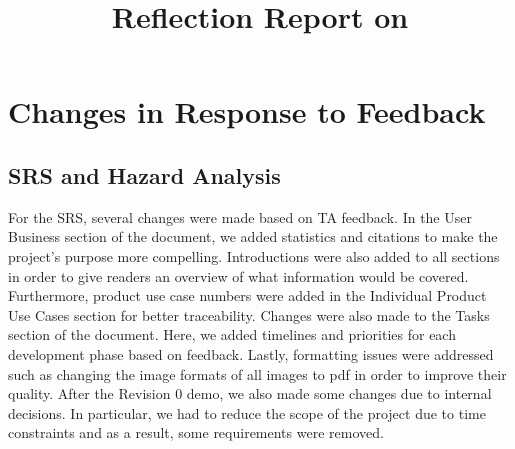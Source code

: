 \documentclass{article}
\title{Reflection Report on \progname}
\author{\authname}
\date{}
\begin{document}
\maketitle


\section{Changes in Response to Feedback}




\subsection{SRS and Hazard Analysis}

For the SRS, several changes were made based on TA feedback. In the User Business
section of the document, we added statistics and citations to make the project's purpose
more compelling. Introductions were also added to all sections in order to give readers an
overview of what information would be covered. Furthermore, product use case numbers were added
in the Individual Product Use Cases section for better traceability. Changes were also made
to the Tasks section of the document. Here, we added timelines and priorities for each development
phase based on feedback. Lastly, formatting issues were addressed such as changing the image formats
of all images to pdf in order to improve their quality. After the Revision 0 demo, we also made
some changes due to internal decisions. In particular, we had to reduce the scope of the project
due to time constraints and as a result, some requirements were removed.
\end{document}
